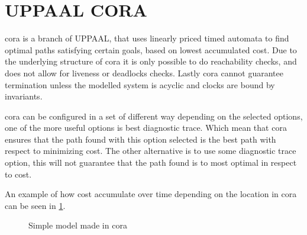 \section{UPPAAL CORA}\label{sec:upp_cora}
\acrfull{cora} is a branch of UPPAAL, that uses linearly priced timed automata to find optimal paths satisfying certain goals, based on lowest accumulated cost\cite{cs_cora}. Due to the underlying structure of \gls{cora} it is only possible to do reachability checks, and does not allow for liveness or deadlocks checks. Lastly \gls{cora} cannot guarantee termination unless the modelled system is acyclic and clocks are bound by invariants\cite{uppaal_cora_download}.

\gls{cora} can be configured in a set of different way depending on the selected options, one of the more useful options is best diagnostic trace. Which mean that \gls{cora} ensures that the path found with this option selected is the best path with respect to minimizing cost. The other alternative is to use some diagnostic trace option, this will not guarantee that the path found is to most optimal in respect to cost.

An example of how cost accumulate over time depending on the location in \gls{cora} can be seen in \cref{fig:cora_eks}.

\begin{figure}[H]
	\centering
	\caption{Simple model made in \gls{cora}}
	\label{fig:cora_eks}
\end{figure}


